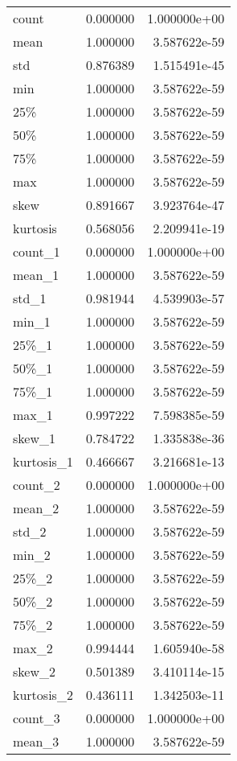\begin{center}
\begin{longtable}{lrr}
\bottomrule
\endlastfoot
count      &  0.000000 &  1.000000e+00 \\
mean       &  1.000000 &  3.587622e-59 \\
std        &  0.876389 &  1.515491e-45 \\
min        &  1.000000 &  3.587622e-59 \\
25\%        &  1.000000 &  3.587622e-59 \\
50\%        &  1.000000 &  3.587622e-59 \\
75\%        &  1.000000 &  3.587622e-59 \\
max        &  1.000000 &  3.587622e-59 \\
skew       &  0.891667 &  3.923764e-47 \\
kurtosis   &  0.568056 &  2.209941e-19 \\
count\_1    &  0.000000 &  1.000000e+00 \\
mean\_1     &  1.000000 &  3.587622e-59 \\
std\_1      &  0.981944 &  4.539903e-57 \\
min\_1      &  1.000000 &  3.587622e-59 \\
25\%\_1      &  1.000000 &  3.587622e-59 \\
50\%\_1      &  1.000000 &  3.587622e-59 \\
75\%\_1      &  1.000000 &  3.587622e-59 \\
max\_1      &  0.997222 &  7.598385e-59 \\
skew\_1     &  0.784722 &  1.335838e-36 \\
kurtosis\_1 &  0.466667 &  3.216681e-13 \\
count\_2    &  0.000000 &  1.000000e+00 \\
mean\_2     &  1.000000 &  3.587622e-59 \\
std\_2      &  1.000000 &  3.587622e-59 \\
min\_2      &  1.000000 &  3.587622e-59 \\
25\%\_2      &  1.000000 &  3.587622e-59 \\
50\%\_2      &  1.000000 &  3.587622e-59 \\
75\%\_2      &  1.000000 &  3.587622e-59 \\
max\_2      &  0.994444 &  1.605940e-58 \\
skew\_2     &  0.501389 &  3.410114e-15 \\
kurtosis\_2 &  0.436111 &  1.342503e-11 \\
count\_3    &  0.000000 &  1.000000e+00 \\
mean\_3     &  1.000000 &  3.587622e-59 \\

\end{longtable}
\end{center}

